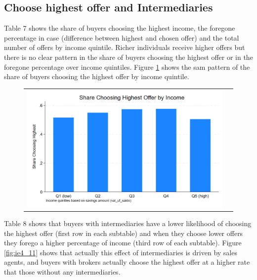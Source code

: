 \documentclass[12pt]{article}
\begin{document}
\newpage

 
\subsection{Choose highest offer and Intermediaries}

Table 7 shows the share of buyers choosing the highest income, the foregone percentage in case (difference between highest and chosen offer) and the total number of offers by income quintile. Richer individuals receive higher offers but there is no clear pattern in the share of buyers choosing the highest offer or in the foregone percentage over income quintiles. Figure \ref{fig:ie4_12} shows the sam pattern of the share of buyers choosing the highest offer by income quintile. 




  \begin{figure}[H]
\caption{}
 \label{fig:ie4_12}
\centering{}%
\begin{tabular}{cc}
\includegraphics[scale=0.27]{../figures/IE4/IE4_highest_by_income.png} 
\end{tabular}
\end{figure} 

Table 8 shows that buyers with intermediaries have a lower likelihood of choosing the highest offer (first row in each subtable) and when they choose lower offers they forego a higher percentage of income (third row of each subtable).
Figure \ref{fig:ie4_11} shows that actually this effect of intermediaries is driven by sales agents, and buyers with brokers actually choose the highest offer at a higher rate that those without any intermediaries. 


\end{document}
